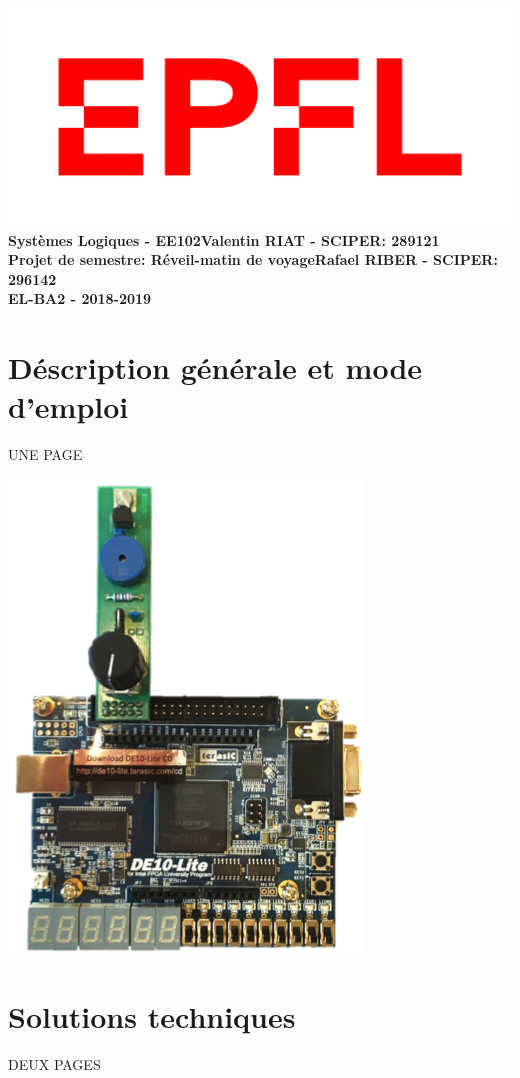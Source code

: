 \documentclass[a4paper, 11pt]{article}
\begin{document}
\noindent \includegraphics[scale=0.2]{figures/logo.png}\\
\large \textbf{Systèmes Logiques - EE102}\hfill \textbf{Valentin RIAT - SCIPER: 289121}\\
 \hfill \large \textbf{Projet de semestre: Réveil-matin de voyage}\hfill \textbf{Rafael RIBER - SCIPER: 296142}\\
  \hfill \large \textbf{EL-BA2 - 2018-2019}

\section{Déscription générale et mode d'emploi}
UNE PAGE

\includegraphics[scale=1]{figures/de10.png}

\section{Solutions techniques}
DEUX PAGES
\end{document}
